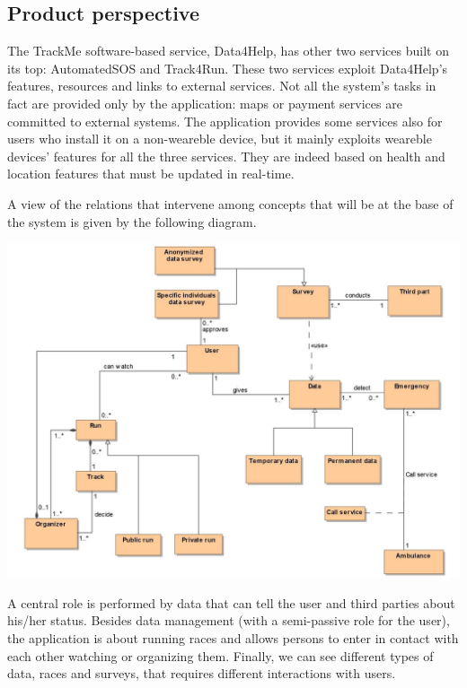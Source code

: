 
%

\subsection{Product perspective}
The TrackMe software-based service, Data4Help, has  other two services built on its top: AutomatedSOS and Track4Run. These two services exploit Data4Help's features, resources and links to external services. Not all the system's tasks in fact are provided only by the application: maps or payment services are committed to external systems. The application provides some services also for users who install it on a non-weareble device, but it mainly exploits weareble devices' features for all the three services. They are indeed based on health and location features that must be updated in real-time. \newline

A view of the relations that intervene among concepts that will be at the base of the system is given by the following diagram. \newline

\begin{center}
\includegraphics[scale=1]{sections/diagrams/class_diagram.jpg}
\end{center}

A central role is performed by data that can tell the user and third parties about his/her status. Besides data management (with a semi-passive role for the user), the application is about running races and allows persons to enter in contact with each other watching or organizing them. Finally, we can see different types of data, races and surveys, that requires different interactions with users. \newpage

